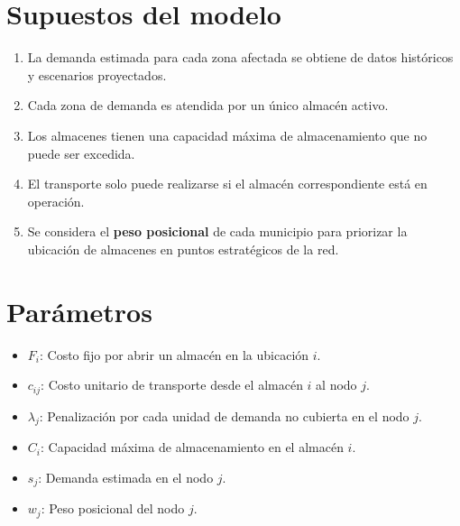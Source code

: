\documentclass[
  spanish,
  us-letterpaper,
]{scrreprt}
\providecommand{\tightlist}{%
  \setlength{\itemsep}{0pt}\setlength{\parskip}{0pt}}
\numberwithin{equation}{chapter} %
\begin{document}
\section{Supuestos del modelo}\label{supuestos-del-modelo}

\begin{enumerate}
\def\labelenumi{\arabic{enumi}.}
\tightlist
\item
  La demanda estimada para cada zona afectada se obtiene de datos
  históricos y escenarios proyectados.\\
\item
  Cada zona de demanda es atendida por un único almacén activo.\\
\item
  Los almacenes tienen una capacidad máxima de almacenamiento que no
  puede ser excedida.\\
\item
  El transporte solo puede realizarse si el almacén correspondiente está
  en operación.\\
\item
  Se considera el \textbf{peso posicional} de cada municipio para
  priorizar la ubicación de almacenes en puntos estratégicos de la red.
\end{enumerate}

\section{Parámetros}\label{paruxe1metros}

\begin{itemize}
\tightlist
\item
  \(F_i\): Costo fijo por abrir un almacén en la ubicación \(i\).\\
\item
  \(c_{ij}\): Costo unitario de transporte desde el almacén \(i\) al
  nodo \(j\).\\
\item
  \(\lambda_j\): Penalización por cada unidad de demanda no cubierta en
  el nodo \(j\).\\
\item
  \(C_i\): Capacidad máxima de almacenamiento en el almacén \(i\).\\
\item
  \(s_j\): Demanda estimada en el nodo \(j\).\\
\item
  \(w_j\): Peso posicional del nodo \(j\).
\end{itemize}
\end{document}
